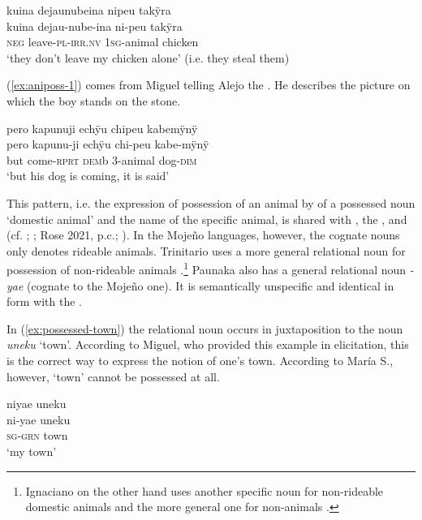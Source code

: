 \ea\label{ex:POSS-animal}
\begingl 
\glpreamble kuina dejaunubeina nipeu takÿra\\
\gla kuina dejau-nube-ina ni-peu takÿra\\ 
\glb \textsc{neg} leave-\textsc{pl}-\textsc{irr.nv} 1\textsc{sg}-animal chicken\\ 
\glft ‘they don't leave my chicken alone’ (i.e. they steal them)\\ 
\endgl
\trailingcitation{[rxx-e120511l.179]}
\xe

(\ref{ex:aniposs-1}) comes from Miguel telling Alejo the . He describes the picture on which the boy stands on the stone. 

\ea\label{ex:aniposs-1}
\begingl
\glpreamble pero kapunuji echÿu chipeu kabemÿnÿ\\
\gla pero kapunu-ji echÿu chi-peu kabe-mÿnÿ\\
\glb but come-\textsc{rprt} \textsc{dem}b 3-animal dog-\textsc{dim}\\
\glft ‘but his dog is coming, it is said’
\endgl
\trailingcitation{[mtx-a110906l.147]}
\xe


This pattern, i.e. the expression of possession of an animal by  of a possessed noun ‘domestic animal’ and the name of the specific animal, is shared with , the , and  (cf. \citealt[50]{ButlerEkdahl2012}; \citealt[51]{OlzaZubiri2004}; Rose 2021, p.c.; \citealt[123--124]{Danielsen2007}). In the Mojeño languages, however, the cognate nouns only denotes rideable animals. Trinitario uses a more general relational noun for possession of non-rideable animals \citep[cf.][79]{Rose2014}.\footnote{Ignaciano on the other hand uses another specific noun for non-rideable domestic animals and the more general one for non-animals \citep[51]{OlzaZubiri2004}.} Paunaka also has a general relational noun \textit{-yae} (cognate to the Mojeño one). It is semantically unspecific and identical in form with the . 

In (\ref{ex:possessed-town}) the relational noun occurs in juxtaposition to the noun \textit{uneku} ‘town’. According to Miguel, who provided this example in elicitation, this is the correct way to express the notion of one’s town. According to María S., however, ‘town’ cannot be possessed at all.

\ea\label{ex:possessed-town}
\begingl 
\glpreamble niyae uneku\\
\gla ni-yae uneku\\ 
\textsc{sg}-\textsc{grn} town\\ 
\glft ‘my town’\\ 
\endgl
\trailingcitation{[mxx-e181017l]}
\xe

